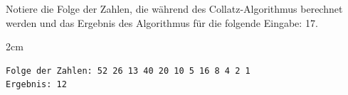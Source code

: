 \question[3]
Notiere die Folge der Zahlen, die während des Collatz-Algorithmus berechnet werden und
das Ergebnis des Algorithmus für die folgende Eingabe: 17.

\begin{solutionbox}{2cm}
\begin{lstlisting}
Folge der Zahlen: 52 26 13 40 20 10 5 16 8 4 2 1
Ergebnis: 12
\end{lstlisting}
\end{solutionbox}
